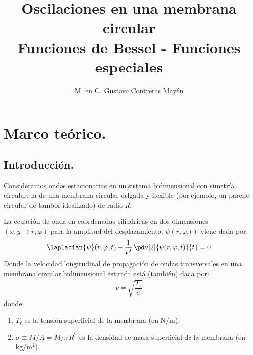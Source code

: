 
\title{Oscilaciones en una membrana circular \\ \large {Funciones de Bessel - Funciones especiales} \vspace{-3ex}}
\author{M. en C. Gustavo Contreras Mayén}
\date{ }

\pagestyle{fancy}
\fancyhf{}
\lhead{\leftmark}
\rfoot{\thepage}
\setlength{\headheight}{16pt}%

\def\changemargin#1#2{\list{}{\rightmargin#2\leftmargin#1}\item[]}
\let\endchangemargin=\endlist 



\maketitle
\fontsize{14}{14}\selectfont
\tableofcontents
\newpage

\section{Marco teórico.}
\subsection{Introducción.}

Consideramos ondas estacionarias en un sistema bidimensional con simetría circular:  la de una membrana circular delgada y flexible (por ejemplo, un parche circular de tambor idealizado) de radio $R$.
\par
La ecuación de onda en coordenadas cilíndricas en dos dimensiones $(x , y \to r, \varphi)$ para la amplitud del desplazamiento, $\psi (r, \varphi, t)$ viene dada por:
\begin{align*}
\laplacian{\psi} (r, \varphi, t) - \dfrac{1}{v^{2}} \, \pdv[2]{\psi (r, \varphi, t)}{t} = 0
\end{align*}
Donde la velocidad longitudinal de propagación de ondas transversales en una membrana circular bidimensional estirada está (también) dada por:
\begin{align*}
v = \sqrt{\dfrac{T_{\ell}}{\sigma}}
\end{align*}
donde:
\begin{enumerate}[label=\alph*)]
\item $T_{\ell}$ es la tensión superficial de la membrana (en $\si{\newton\per\metre}$).
\item $\sigma \equiv M/A = M / \pi \, R^{2}$ es la densidad de masa superficial de la membrana (en $\si{\kilo\gram\per\square\metre}$).
\end{enumerate}

